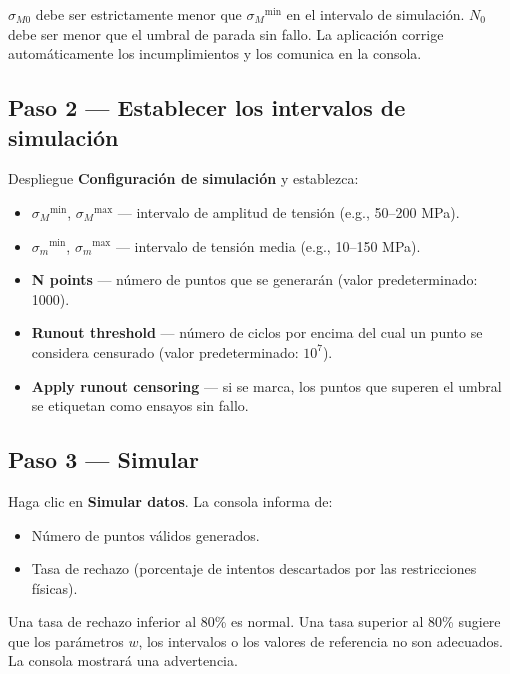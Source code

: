 \documentclass[11pt,a4paper]{article}
\newcommand{\sm}{\ensuremath{\sigma_m}}
\newcommand{\sM}{\ensuremath{\sigma_M}}
\newcommand{\sMzero}{\ensuremath{\sigma_{M0}}}
\newcommand{\Nzero}{\ensuremath{N_0}}
\begin{document}
\begin{warnbox}
$\sMzero$ debe ser estrictamente menor que $\sM^{\min}$ en el intervalo de simulación. $\Nzero$ debe ser menor que el umbral de parada sin fallo. La aplicación corrige automáticamente los incumplimientos y los comunica en la consola.
\end{warnbox}

\subsection{Paso 2 --- Establecer los intervalos de simulación}

Despliegue \textbf{Configuración de simulación} y establezca:
\begin{itemize}[leftmargin=1.4em]
  \item $\sM^{\min}$, $\sM^{\max}$ --- intervalo de amplitud de tensión (e.g., 50--200 MPa).
  \item $\sm^{\min}$, $\sm^{\max}$ --- intervalo de tensión media (e.g., 10--150 MPa).
  \item \textbf{N points} --- número de puntos que se generarán (valor predeterminado: 1000).
  \item \textbf{Runout threshold} --- número de ciclos por encima del cual un punto se considera censurado (valor predeterminado: $10^7$).
  \item \textbf{Apply runout censoring} --- si se marca, los puntos que superen el umbral se etiquetan como ensayos sin fallo.
\end{itemize}

\subsection{Paso 3 --- Simular}

Haga clic en \textbf{\textcolor{greenhl}{Simular datos}}. La consola informa de:
\begin{itemize}[leftmargin=1.4em]
  \item Número de puntos válidos generados.
  \item Tasa de rechazo (porcentaje de intentos descartados por las restricciones físicas).
\end{itemize}

\begin{tipbox}
Una tasa de rechazo inferior al 80\% es normal. Una tasa superior al 80\% sugiere que los parámetros $w$, los intervalos o los valores de referencia no son adecuados. La consola mostrará una advertencia.
\end{tipbox}
\end{document}
